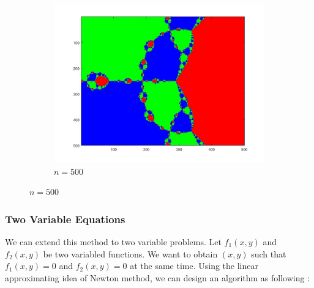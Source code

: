 \documentclass[paper=a4, fontsize=11pt]{scrartcl}
\begin{document}
\begin{figure}[htb]
\begin{subfigure}{0.25\textwidth}
	\includegraphics[width=\linewidth]{fractal_500_25}
	\caption{$n=500$}
\end{subfigure}
\end{figure}

\subsubsection{Two Variable Equations}
\vspace{0.15in}

We can extend this method to two variable problems. Let $f_1(x,y)$ and $f_2(x,y)$ be two variabled functions. We want to obtain $(x,y)$ such that $f_1(x,y)=0$ and $f_2(x,y)=0$ at the same time. Using the linear approximating idea of Newton method, we can design an algorithm as following :\\
\end{document}
